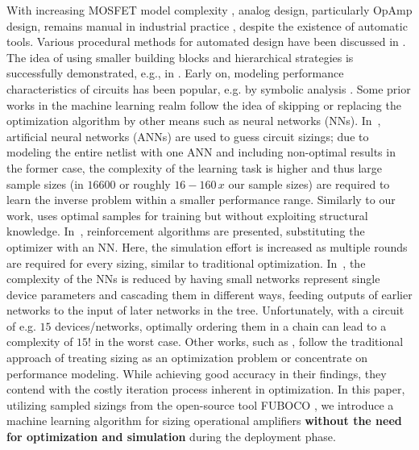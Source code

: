 \documentclass[conference]{IEEEtran}
\begin{document}
    With increasing MOSFET model complexity \cite{gatermann22mosfet}, analog design, particularly OpAmp design, remains manual in industrial practice \cite{gielen23workshop}, despite the existence of automatic tools. Various procedural methods for automated design have been discussed in \cite{prautsch16reuse, crossley13bag, schweikardt22scheible}. The idea of using smaller building blocks and hierarchical strategies is successfully demonstrated, e.g., in \cite{meissner15feats, abel2022fuboco, mendhurwar2012structureneural, synthesis23zhang, canelas22hierachical}. 
	Early on, modeling  performance characteristics of circuits has been popular, e.g. by symbolic analysis \cite{cuatle10symbolic, wambacq95symbolic}. %
	Some prior works in the machine learning realm follow the idea of skipping or replacing the optimization algorithm by other means such as neural networks (NNs). In~\cite{lourenco18}, artificial neural networks (ANNs) are used to guess circuit sizings; due to modeling the entire netlist with one ANN and including non-optimal results in the former case, the complexity of the learning task is higher and thus large sample sizes (in \cite{lourenco18} $16600$ or roughly $16-160 \, x$ our sample sizes) are required to learn the inverse problem within a smaller performance range. Similarly to our work,  \cite{lourenco19pareto} uses optimal samples for training but without exploiting structural knowledge. In~\cite{gao23rose, settaluri22reinforcement}, reinforcement  algorithms are presented, substituting the optimizer with an NN.
	 Here, the simulation effort is increased as multiple rounds are required for every sizing, similar to traditional optimization. In~\cite{beaulieu23cascaded}, the complexity of the NNs is reduced by having small networks represent single device parameters and cascading them in different ways, feeding outputs of earlier networks to the input of later networks in the tree.
	 Unfortunately, with a circuit of e.g. $15$ devices/networks, optimally ordering them in a chain can lead to a complexity of $15!$ in the worst case.
	Other works, such as \cite{fayazi23angel, budak23apostle, wolfe03nnmodel, hakhamaneshi23pretraining}, follow the traditional approach of treating sizing as an optimization problem or concentrate on performance modeling. While achieving good accuracy in their findings, they contend with the costly iteration process inherent in optimization.
\newline
	In this paper, utilizing sampled sizings from the open-source tool FUBOCO \cite{fuboco-github}, we introduce a machine learning algorithm for sizing operational amplifiers \textbf{without the need for optimization and simulation} during the deployment phase. 
\end{document}
